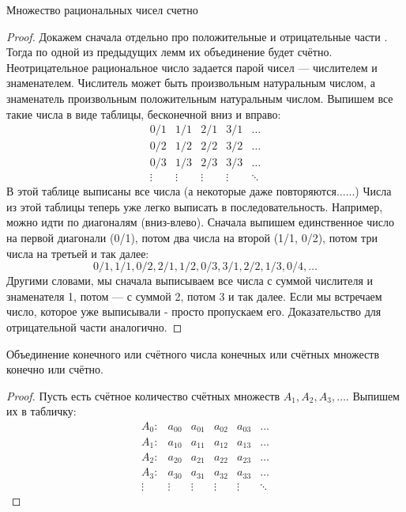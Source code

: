 \begin{lemma} \thmslashn

	Множество рациональных чисел \Q счетно
	\begin{proof} \thmslashn
	
		Докажем сначала отдельно про положительные и отрицательные части \Q. Тогда по одной из предыдущих лемм их объединение будет счётно. \newline
		Неотрицательное рациональное число задается парой чисел — числителем и знаменателем. Числитель может быть произвольным натуральным числом, а знаменатель произвольным положительным натуральным числом. Выпишем все такие числа в виде таблицы, бесконечной вниз и вправо:
		\begin{equation*}
			\begin{matrix}
				0/1 & 1/1 & 2/1 & 3/1 & \ldots \\
				0/2 & 1/2 & 2/2 & 3/2 & \ldots \\
				0/3 & 1/3 & 2/3 & 3/3 & \ldots \\
				\vdots & \vdots & \vdots & \vdots & \ddots 
			\end{matrix}
		\end{equation*}
		В этой таблице выписаны все числа (а некоторые даже повторяются......) \newline
		Числа из этой таблицы теперь уже легко выписать в последовательность. Например, можно идти по диагоналям (вниз-влево). Сначала выпишем единственное число на первой диагонали (0/1), потом два числа на второй (1/1, 0/2), потом три числа на третьей и так далее:
		$$0/1, 1/1, 0/2, 2/1, 1/2, 0/3, 3/1, 2/2, 1/3, 0/4, \ldots $$
		Другими словами, мы сначала выписываем все числа с суммой числителя и знаменателя 1, потом — с суммой 2, потом 3 и так далее. Если мы встречаем число, которое уже выписывали - просто пропускаем его. \newline
		Доказательство для отрицательной части \Q аналогично.
	\end{proof}
\end{lemma}

\begin{theorem} \thmslashn

	Объединение конечного или счётного числа конечных или счётных множеств конечно или счётно.
	\begin{proof} \thmslashn
	
		Пусть есть счётное количество счётных множеств $A_1, A_2, A_3, \ldots$. Выпишем их в табличку:
		\begin{equation*}
			\begin{matrix}
				A_0: & a_{00} & a_{01} & a_{02} & a_{03} & \ldots \\
				A_1: & a_{10} & a_{11} & a_{12} & a_{13} & \ldots \\
				A_2: & a_{20} & a_{21} & a_{22} & a_{23} & \ldots \\
				A_3: & a_{30} & a_{31} & a_{32} & a_{33} & \ldots \\
				\vdots & \vdots & \vdots & \vdots & \vdots & \ddots 
			\end{matrix}
		\end{equation*}
	\end{proof}
\end{theorem}

